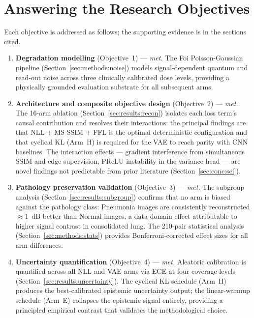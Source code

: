 \documentclass[12pt, a4paper, twoside, openright]{book}
\begin{document}
\section{Answering the Research Objectives}
\label{sec:conc:objectives}

Each objective is addressed as follows; the supporting evidence is in the sections cited.

\begin{enumerate}
  \item \textbf{Degradation modelling} (Objective~1) — \emph{met.} The Foi Poisson-Gaussian pipeline (Section~\ref{sec:methods:noise}) models signal-dependent quantum and read-out noise across three clinically calibrated dose levels, providing a physically grounded evaluation substrate for all subsequent arms.

  \item \textbf{Architecture and composite objective design} (Objective~2) — \emph{met.} The 16-arm ablation (Section~\ref{sec:results:recon}) isolates each loss term's causal contribution and resolves their interactions: the principal findings are that NLL + MS-SSIM + FFL is the optimal deterministic configuration and that cyclical KL (Arm~H) is required for the VAE to reach parity with CNN baselines. The interaction effects — gradient interference from simultaneous SSIM and edge supervision, PReLU instability in the variance head — are novel findings not predictable from prior literature (Section~\ref{sec:conc:sci}).

  \item \textbf{Pathology preservation validation} (Objective~3) — \emph{met.} The subgroup analysis (Section~\ref{sec:results:subgroup}) confirms that no arm is biased against the pathology class: Pneumonia images are consistently reconstructed $\approx 1$~dB better than Normal images, a data-domain effect attributable to higher signal contrast in consolidated lung. The 210-pair statistical analysis (Section~\ref{sec:methods:stats}) provides Bonferroni-corrected effect sizes for all arm differences.

  \item \textbf{Uncertainty quantification} (Objective~4) — \emph{met.} Aleatoric calibration is quantified across all NLL and VAE arms via ECE at four coverage levels (Section~\ref{sec:results:uncertainty}). The cyclical KL schedule (Arm~H) produces the best-calibrated epistemic uncertainty output; the linear-warmup schedule (Arm~E) collapses the epistemic signal entirely, providing a principled empirical contrast that validates the methodological choice.
\end{enumerate}
\end{document}
